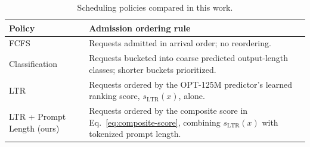 \begin{table}[t]
    \centering
    \caption{Scheduling policies compared in this work.}
    \label{tab:scheduling_policies}
    \begin{tabular}{@{}p{1.5cm}p{5.4cm}@{}}
        \toprule
        Policy & Admission ordering rule \\
        \midrule
        FCFS & Requests admitted in arrival order; no reordering. \\
        Classification & Requests bucketed into coarse predicted output-length classes; shorter buckets prioritized. \\
        LTR & Requests ordered by the OPT-125M predictor's learned ranking score, $s_{\mathrm{LTR}}(x)$, alone. \\
        LTR + Prompt Length (ours) & Requests ordered by the composite score in Eq.~\eqref{eq:composite-score}, combining $s_{\mathrm{LTR}}(x)$ with tokenized prompt length. \\
        \bottomrule
    \end{tabular}
\end{table}
